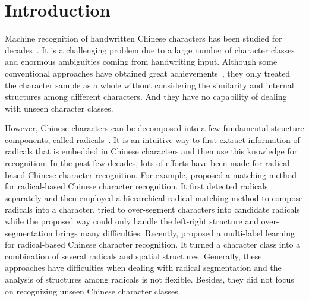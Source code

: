 \documentclass[a4paper,conference]{IEEEtran}
\begin{document}
\IEEEpeerreviewmaketitle



\section{Introduction}
\label{sec:Introduction}
Machine recognition of handwritten Chinese characters has been studied for decades~\cite{suen1980automatic}. It is a challenging problem due to a large number of character classes and enormous ambiguities coming from handwriting input. Although some conventional approaches have obtained great achievements~\cite{plamondon2000online,liu2004online,zhang2017drawing,yang2016dropsample,zhong2015high}, they only treated the character sample as a whole without considering the similarity and internal structures among different characters. And they have no capability of dealing with unseen character classes.

However, Chinese characters can be decomposed into a few fundamental structure components, called radicals~\cite{chang1973interactive}. It is an intuitive way to first extract information of radicals that is embedded in Chinese characters and then use this knowledge for recognition. In the past few decades, lots of efforts have been made for radical-based Chinese character recognition. For example, \cite{wang2001optical} proposed a matching method for radical-based Chinese character recognition. It first detected radicals separately and then employed a hierarchical radical matching method to compose radicals into a character. \cite{ma2008new} tried to over-segment characters into candidate radicals while the proposed way could only handle the left-right structure and over-segmentation brings many difficulties. Recently, \cite{wang2017label} proposed a multi-label learning for radical-based Chinese character recognition. It turned a character class into a combination of several radicals and spatial structures. Generally, these approaches have difficulties when dealing with radical segmentation and the analysis of structures among radicals is not flexible. Besides, they did not focus on recognizing unseen Chinese character classes.
\end{document}
